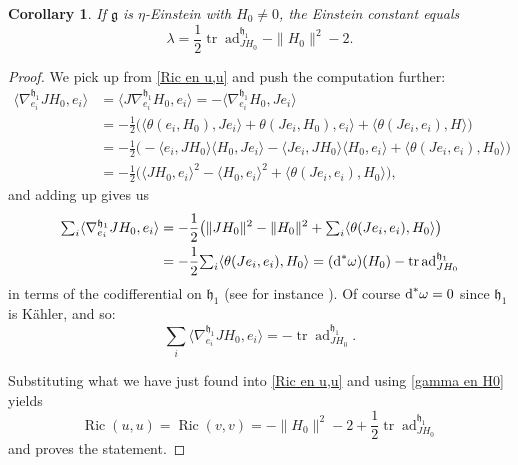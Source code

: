 \documentclass[12pt, twoside]{amsart}
\def\D{\textup{d}}
\def\g{\mathfrak{g}}
\def\h{\mathfrak{h}}
\def\ad{\operatorname{ad}}
\def\ric{\operatorname{Ric}}
\def\tr{\operatorname{tr}}
\newtheorem{coro}[definition]{Corollary}
\theoremstyle{definition}
\begin{document}
\begin{coro}
If $\g$ is $\eta$-Einstein with $H_{0}\neq 0$, the Einstein constant equals
\begin{equation} \label{lambda para eistein}
    \lambda=\frac{1}{2}\tr\ad^{\h_1}_{JH_0} -\| H_0 \|^{2}-2.
\end{equation}
 \end{coro}
\begin{proof}
We pick up from \eqref{Ric en u,u} and push the computation further:
\begin{equation*}\begin{split}
    \langle \nabla^{\h_1}_{e_i}JH_0, e_i \rangle &=\langle J \nabla ^{\h_1}_{e_i}H_0, e_i \rangle =- \langle \nabla^{\h_1}_{e_i}H_0, Je_i \rangle\\
    &=-\frac{1}{2} \big( \langle \theta (e_i,H_0) , Je_i \rangle + \theta (Je_i, H_0) ,e_i \rangle + \langle \theta(Je_i, e_i) , H \rangle \big)\\
    &=-\frac{1}{2} \big( -\langle e_i , JH_0 \rangle \langle H_0 , Je_i \rangle - \langle Je_i, JH_0 \rangle \langle H_0 , e_i \rangle + \langle \theta(Je_i, e_i) , H_0 \rangle\big) \\
    &=-\frac{1}{2} \big( \langle JH_0, e_i \rangle ^{2}- \langle H_0, e_i \rangle ^{2} + \langle \theta(Je_i, e_i) , H_0 \rangle \big),
\end{split}\end{equation*}
and adding up gives us 
\begin{equation*}\begin{split}
    {\textstyle\sum}_i \langle \nabla^{\h_1}_{e_i}JH_0, e_i \rangle &=
    -\frac{1}{2}\big(\|JH_0\|^2-\|H_0\|^2 + {\textstyle\sum}_i\langle \theta(Je_i, e_i) , H_0 \rangle \big)\\
      &=-\frac{1}{2} {\textstyle\sum}_i  \langle \theta(Je_i, e_i) , H_0 \rangle  
= (\D^{*} \omega)(H_0) - \tr \ad^{\h_1}_{JH_0}
\end{split}\end{equation*}
in terms of the codifferential on $\h_1$ (see for instance \cite[Section 2]{ab}).
Of course $\D^\ast \omega=0$ since $\h_1$ is K{\"a}hler, and so:
\begin{equation} \label{ad y traza}
    {\textstyle\sum}_i  \langle \nabla^{\h_1}_{e_i}JH_0, e_i \rangle=- \tr \ad^{\h_1} _{JH_0}.
\end{equation}

Substituting what we have just found into \eqref{Ric en u,u} and using \eqref{gamma en H0} yields
\begin{equation}
\ric (u,u)=\ric (v, v)=-\| H_0 \|^{2}-2+\frac{1}{2}\tr\ad^{\h_1}_{JH_0}
\end{equation}
and proves the statement.
\end{proof}
\end{document}
